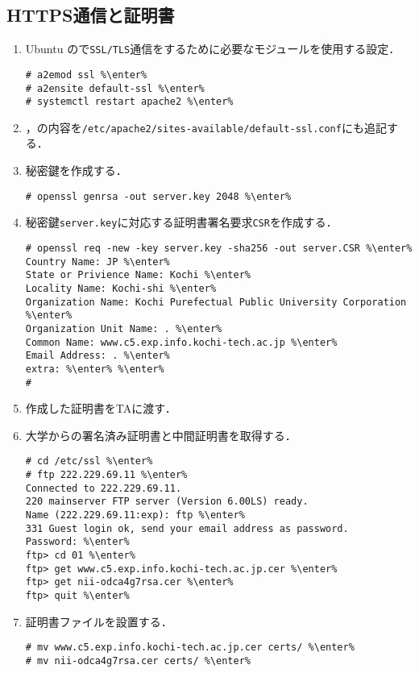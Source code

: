 \documentclass{jlreq}
\begin{document}
\subsection{HTTPS通信と証明書}
\begin{enumerate}
    \item Ubuntu の\apache で\texttt{SSL/TLS}通信をするために必要なモジュールを使用する設定．
          \begin{lstlisting}
# a2emod ssl %\enter%
# a2ensite default-ssl %\enter%
# systemctl restart apache2 %\enter%
\end{lstlisting}
    \item {}，の内容を\texttt{/etc/apache2/sites-available/default-ssl.conf}にも追記する．
    \item 秘密鍵を作成する．
          \begin{lstlisting}
# openssl genrsa -out server.key 2048 %\enter%
\end{lstlisting}
    \item 秘密鍵\texttt{server.key}に対応する証明書署名要求\texttt{CSR}を作成する．
          \begin{lstlisting}
# openssl req -new -key server.key -sha256 -out server.CSR %\enter%
Country Name: JP %\enter%
State or Privience Name: Kochi %\enter%
Locality Name: Kochi-shi %\enter%
Organization Name: Kochi Purefectual Public University Corporation %\enter%
Organization Unit Name: . %\enter%
Common Name: www.c5.exp.info.kochi-tech.ac.jp %\enter%
Email Address: . %\enter%
extra: %\enter% %\enter%
# 
\end{lstlisting}
    \item 作成した証明書をTAに渡す．
    \item 大学からの署名済み証明書と中間証明書を取得する．
          \begin{lstlisting}
# cd /etc/ssl %\enter%
# ftp 222.229.69.11 %\enter%
Connected to 222.229.69.11.
220 mainserver FTP server (Version 6.00LS) ready.
Name (222.229.69.11:exp): ftp %\enter%
331 Guest login ok, send your email address as password. 
Password: %\enter%
ftp> cd 01 %\enter%
ftp> get www.c5.exp.info.kochi-tech.ac.jp.cer %\enter%
ftp> get nii-odca4g7rsa.cer %\enter%
ftp> quit %\enter%
\end{lstlisting}
    \item 証明書ファイルを設置する．
          \begin{lstlisting}
# mv www.c5.exp.info.kochi-tech.ac.jp.cer certs/ %\enter%
# mv nii-odca4g7rsa.cer certs/ %\enter%
\end{lstlisting}

\end{enumerate}
\end{document}
